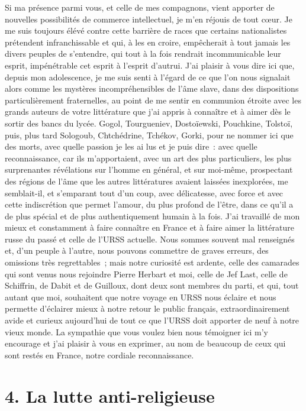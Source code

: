 \documentclass[twoside]{book} %
\begin{document}
Si ma présence parmi vous, et celle de mes compagnons, vient apporter de nouvelles possibilités de commerce intellectuel, je m’en réjouis de tout cœur. Je me suis toujours élévé contre cette barrière de races que certains nationalistes prétendent infranchissable et qui, à les en croire, empêcherait à tout jamais les divers peuples de s’entendre, qui tout à la fois rendrait incommunicable leur esprit, impénétrable cet esprit à l’esprit d’autrui. J’ai plaisir à vous dire ici que, depuis mon adolescence, je me suis senti à l’égard de ce que l’on nous signalait alors comme les mystères incompréhensibles de l’âme slave, dans des dispositions particulièrement fraternelles, au point de me sentir en communion étroite avec les grands auteurs de votre littérature que j’ai appris à connaître et à aimer dès le sortir des bancs du lycée. Gogol, Tourgueniev, Dostoïewski, Pouchkine, Tolstoï, puis, plus tard Sologoub, Chtchédrine, Tchékov, Gorki, pour ne nommer ici que des morts, avec quelle passion je les ai lus et je puis dire : avec quelle reconnaissance, car ils m’apportaient, avec un art des plus particuliers, les plus surprenantes révélations sur l’homme en général, et sur moi-même, prospectant des régions de l’âme que les autres littératures avaient laissées inexplorées, me semblait-il, et s’emparant tout d’un coup, avec délicatesse, avec force et avec cette indiscrétion que permet l’amour, du plus profond de l’être, dans ce qu’il a de plus spécial et de plus authentiquement humain à la fois. J’ai travaillé de mon mieux et constamment à faire connaître en France et à faire aimer la littérature russe du passé et celle de l’URSS actuelle. Nous sommes souvent mal renseignés et, d’un peuple à l’autre, nous pouvons commettre de graves erreurs, des omissions très regrettables ; mais notre curiosité est ardente, celle des camarades qui sont venus nous rejoindre Pierre Herbart et moi, celle de Jef Last, celle de Schiffrin, de Dabit et de Guilloux, dont deux sont membres du parti, et qui, tout autant que moi, souhaitent que notre voyage en URSS nous éclaire et nous permette d’éclairer mieux à notre retour le public français, extraordinairement avide et curieux aujourd’hui de tout ce que l’URSS doit apporter de neuf à notre vieux monde. La sympathie que vous voulez bien nous témoigner ici m’y encourage et j’ai plaisir à vous en exprimer, au nom de beaucoup de ceux qui sont restés en France, notre cordiale reconnaissance.

\section[{4. La lutte anti-religieuse}]{4. La lutte anti-religieuse}
\end{document}
